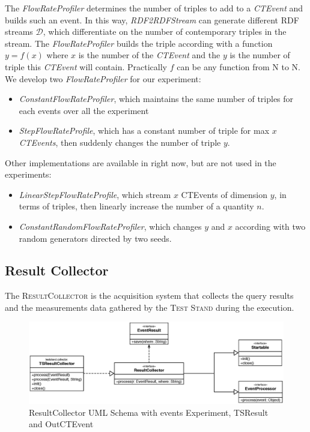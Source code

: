 The \textit{FlowRateProfiler} determines the number of triples to add to a \textit{CTEvent} and builds such an event. In this way, \textit{RDF2RDFStream} can generate different RDF streams $\mathcal{D}$, which differentiate on the number of contemporary triples in the stream. The \textit{FlowRateProfiler} builds the triple according with a function $y=f(x)$ where $x$ is the number of the \textit{CTEvent} and the $y$ is the number of triple this \textit{CTEvent} will contain. Practically $f$ can be any function from N to N. We develop two \textit{FlowRateProfiler} for our experiment: 
\begin{itemize}
\item \textit{ConstantFlowRateProfiler}, which maintains the same number of triples for each events over all the experiment  
\item \textit{StepFlowRateProfile}, which has a constant number of triple for max $x$ \textit{CTEvents}, then suddenly changes the number of triple $y$.
\end{itemize}
Other implementations are available in \name right now, but are not used in the experiments:
\begin{itemize}
\item \textit{LinearStepFlowRateProfile}, which stream $x$ CTEvents of dimension $y$, in terms of triples, then linearly increase the number of a quantity $n$.
\item \textit{ConstantRandomFlowRateProfiler}, which changes $y$ and $x$ according with two random generators directed by two seeds.
\end{itemize}

\subsection{Result Collector} 

\noindent The \textsc{ResultCollector} is the acquisition system that collects the query results and the measurements data gathered by the \textsc{Test Stand} during the execution.

\begin{figure}[tbh]
  \centering
	\includegraphics[width=\linewidth]{images/uml_resultcollector}
	\caption{ResultCollector UML Schema with events Experiment, TSResult and OutCTEvent} 
  	\label{fig:uml_resultcollector}
\end{figure}

